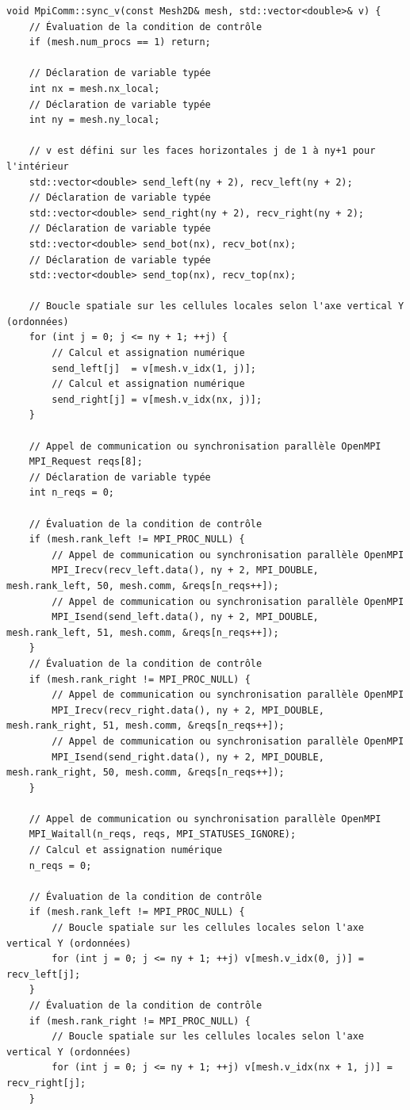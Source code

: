 \documentclass[10pt,a4paper,oneside]{book}
\begin{document}
\begin{lstlisting}[language={[11]C++}]
void MpiComm::sync_v(const Mesh2D& mesh, std::vector<double>& v) {
    // Évaluation de la condition de contrôle
    if (mesh.num_procs == 1) return;

    // Déclaration de variable typée
    int nx = mesh.nx_local;
    // Déclaration de variable typée
    int ny = mesh.ny_local;

    // v est défini sur les faces horizontales j de 1 à ny+1 pour l'intérieur
    std::vector<double> send_left(ny + 2), recv_left(ny + 2);
    // Déclaration de variable typée
    std::vector<double> send_right(ny + 2), recv_right(ny + 2);
    // Déclaration de variable typée
    std::vector<double> send_bot(nx), recv_bot(nx);
    // Déclaration de variable typée
    std::vector<double> send_top(nx), recv_top(nx);

    // Boucle spatiale sur les cellules locales selon l'axe vertical Y (ordonnées)
    for (int j = 0; j <= ny + 1; ++j) {
        // Calcul et assignation numérique
        send_left[j]  = v[mesh.v_idx(1, j)];
        // Calcul et assignation numérique
        send_right[j] = v[mesh.v_idx(nx, j)];
    }

    // Appel de communication ou synchronisation parallèle OpenMPI
    MPI_Request reqs[8];
    // Déclaration de variable typée
    int n_reqs = 0;

    // Évaluation de la condition de contrôle
    if (mesh.rank_left != MPI_PROC_NULL) {
        // Appel de communication ou synchronisation parallèle OpenMPI
        MPI_Irecv(recv_left.data(), ny + 2, MPI_DOUBLE, mesh.rank_left, 50, mesh.comm, &reqs[n_reqs++]);
        // Appel de communication ou synchronisation parallèle OpenMPI
        MPI_Isend(send_left.data(), ny + 2, MPI_DOUBLE, mesh.rank_left, 51, mesh.comm, &reqs[n_reqs++]);
    }
    // Évaluation de la condition de contrôle
    if (mesh.rank_right != MPI_PROC_NULL) {
        // Appel de communication ou synchronisation parallèle OpenMPI
        MPI_Irecv(recv_right.data(), ny + 2, MPI_DOUBLE, mesh.rank_right, 51, mesh.comm, &reqs[n_reqs++]);
        // Appel de communication ou synchronisation parallèle OpenMPI
        MPI_Isend(send_right.data(), ny + 2, MPI_DOUBLE, mesh.rank_right, 50, mesh.comm, &reqs[n_reqs++]);
    }

    // Appel de communication ou synchronisation parallèle OpenMPI
    MPI_Waitall(n_reqs, reqs, MPI_STATUSES_IGNORE);
    // Calcul et assignation numérique
    n_reqs = 0;

    // Évaluation de la condition de contrôle
    if (mesh.rank_left != MPI_PROC_NULL) {
        // Boucle spatiale sur les cellules locales selon l'axe vertical Y (ordonnées)
        for (int j = 0; j <= ny + 1; ++j) v[mesh.v_idx(0, j)] = recv_left[j];
    }
    // Évaluation de la condition de contrôle
    if (mesh.rank_right != MPI_PROC_NULL) {
        // Boucle spatiale sur les cellules locales selon l'axe vertical Y (ordonnées)
        for (int j = 0; j <= ny + 1; ++j) v[mesh.v_idx(nx + 1, j)] = recv_right[j];
    }


\end{lstlisting}
\end{document}
